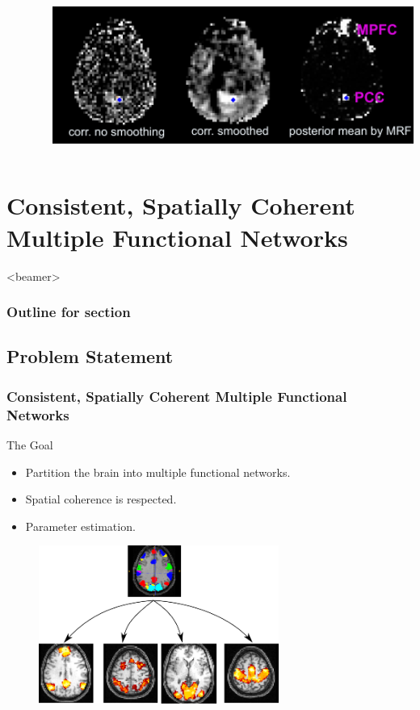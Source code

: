\documentclass[sansserif, 10pt]{beamer}
\begin{document}
\begin{frame}
\begin{columns}
\begin{column}{0.4\textwidth}
    \end{column}
    \begin{column}{0.6\textwidth}
       {
        \includegraphics[width=1.0\textwidth]{sfig/m1_real}
      }
    \end{column}
  \end{columns}
\end{frame}

\section{Consistent, Spatially Coherent Multiple Functional Networks}

\begin{frame}<beamer>
  \frametitle{Outline for section \thesection}
  \tableofcontents[currentsection, sectionstyle=show/hide, subsectionstyle=show/show/hide]
\end{frame}


\subsection{Problem Statement}
\begin{frame}
\frametitle{Consistent, Spatially Coherent Multiple Functional
  Networks}
\begin{block}{The Goal}
  \begin{itemize}
  \item Partition the brain into multiple functional networks.
  \item Spatial coherence is respected.
  \item Parameter estimation.
  \end{itemize}
\end{block}
\vspace{10pt}
\begin{figure}
  \centering
  \includegraphics[width=0.7\textwidth]{sfig/myseg}
\end{figure}
\end{frame}
\end{document}
